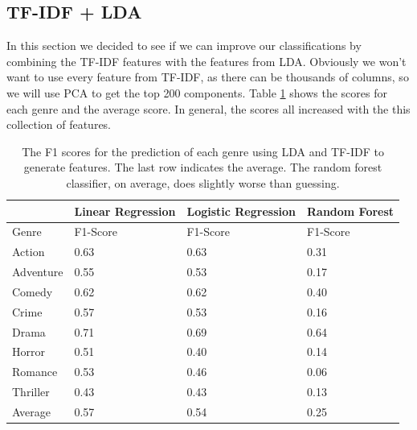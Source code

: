 \documentclass[11pt]{article}
\begin{document}
\subsection{TF-IDF + LDA}
\label{sec:tfidf_lda}

In this section we decided to see if we can improve our classifications by combining the TF-IDF features with the features from LDA. Obviously we won't want to use every feature from TF-IDF, as there can be thousands of columns, so we will use PCA to get the top 200 components. Table \ref{tab:lda_tfidf_scores} shows the scores for each genre and the average score. In general, the scores all increased with the this collection of features. 

\begin{table}[h]
	\label{tab:lda_tfidf_scores}
\begin{center}
	\begin{tabular}{| l | l | l | l |}
		\hline
		           & Linear Regression & Logistic Regression & Random Forest \\
		\hline
		Genre      & F1-Score          & F1-Score            & F1-Score       \\
	  	\hline			
	  	Action     & 0.63              & 0.63                & 0.31 \\
	  	Adventure  & 0.55              & 0.53                & 0.17 \\ 
	  	Comedy     & 0.62              & 0.62                & 0.40 \\
	  	Crime      & 0.57              & 0.53                & 0.16 \\
	  	Drama      & 0.71              & 0.69                & 0.64 \\
	  	Horror     & 0.51              & 0.40                & 0.14 \\
	  	Romance    & 0.53              & 0.46                & 0.06 \\
	  	Thriller   & 0.43              & 0.43                & 0.13 \\
	  	\hline
	  	Average    & 0.57              & 0.54                & 0.25 \\
	  \hline  
	\end{tabular}
\end{center}
	\caption{The F1 scores for the prediction of each genre using LDA and TF-IDF to generate features. The last row indicates the average. The random forest classifier, on average, does slightly worse than guessing.}
\end{table}
\end{document}
